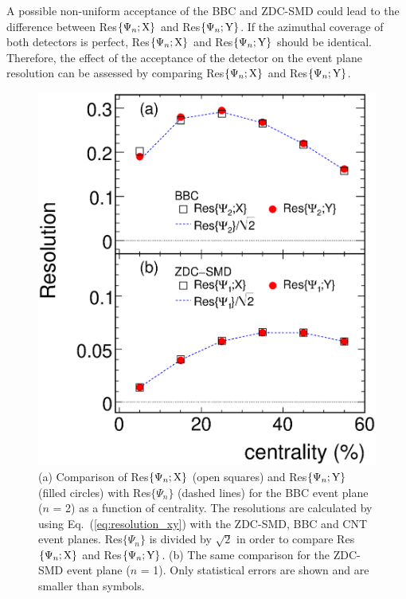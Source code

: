 \documentclass[aps,prc,superscriptaddress,showpacs,floatfix,twocolumn]{revtex4}
\begin{document}
A possible non-uniform acceptance of the BBC and ZDC-SMD could lead to the difference between 
Res$\{\Psi_n;{\rm X}\}$ and Res$\{\Psi_n;{\rm Y}\}$. If the azimuthal coverage of both detectors 
is perfect, Res$\{\Psi_n;{\rm X}\}$ and Res$\{\Psi_n;{\rm Y}\}$ should be identical. Therefore, 
the effect of the acceptance of the detector on the event plane resolution can be assessed by  
comparing Res$\{\Psi_n;{\rm X}\}$ and Res$\{\Psi_n;{\rm Y}\}$.

\begin{figure}[thb]
\includegraphics[width=1.0\linewidth]{resolution_xy_vs_centrality_BBC_and_ZDC-SMD_threesubevents.eps}

\caption{\label{fig:resolution_xy_vs_centrality_BBC_and_ZDC-SMD}
(a) Comparison of Res$\{\Psi_n;{\rm X}\}$ (open squares) and 
Res$\{\Psi_n;{\rm Y}\}$ (filled circles) with Res$\{\Psi_n\}$ (dashed 
lines) for the BBC event plane ($n$ = 2) as a function of centrality. The 
resolutions are calculated by using Eq.~(\ref{eq:resolution_xy}) with the 
ZDC-SMD, BBC and CNT event planes. Res$\{\Psi_n\}$ is divided by $\sqrt{2}$ 
in order to compare Res$\{\Psi_n;{\rm X}\}$ and Res$\{\Psi_n;{\rm Y}\}$.
(b) The same comparison for the ZDC-SMD event plane ($n$ = 1).
Only statistical errors are shown and are smaller than symbols.
}
\end{figure}
\end{document}
